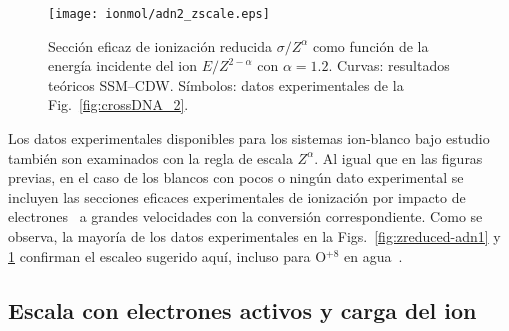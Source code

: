\begin{figure}
\centering
\texttt{[image: ionmol/adn2\_zscale.eps]}
\caption[Sección eficaz de ionización reducida por $Z$ y $\alpha$ 
(Parte II).]
{Sección eficaz de ionización reducida $\sigma/Z^{\alpha}$ como función
de la energía incidente del ion $E/Z^{2-\alpha}$ con $\alpha=1.2$. 
Curvas: resultados teóricos SSM--CDW. 
Símbolos: datos experimentales de la Fig.~\ref{fig:crossDNA_2}.}
\label{fig:zreduced-adn2}
\end{figure} 

Los datos experimentales disponibles para los sistemas ion-blanco bajo 
estudio~\cite{Iriki:11,Sens:20,Bhattacharjee:19,itoh2013,wolff2014,
wang2016,agnihotri2012,agnihotri2013,Luna2007,Bolorizadeh86,H_Rudd85,
He_Rudd85,toburen80,Ohsawa05,Bhattacharjee:17,DalCappello:09,
Bhattacharjee:16} también son examinados con la regla de escala 
$Z^\alpha$. Al igual que en las figuras previas, en el caso de los 
blancos con pocos o ningún dato experimental se incluyen las secciones 
eficaces experimentales de ionización por impacto de 
electrones~\cite{Rahman:16,bug2017,wolf2019,fuss2009} a grandes 
velocidades con la conversión correspondiente. Como se observa, la 
mayoría de los datos experimentales en la Figs.~\ref{fig:zreduced-adn1} 
y \ref{fig:zreduced-adn2} confirman el escaleo sugerido aquí, incluso 
para O$^{+8}$ en agua~\cite{Bhattacharjee:16}. 

\subsection{Escala con electrones activos y carga del ion}
\label{sec:nez_scaling}

